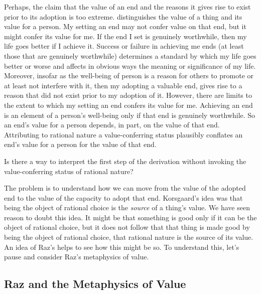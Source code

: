 \documentclass[12pt]{article}
\begin{document}
Perhaps, the claim that the value of an end and the reasons it gives rise to exist prior to its adoption is too extreme. \citet{Raz:2001ps} distinguishes the value of a thing and its value for a person. My setting an end may not confer value on that end, but it might confer its value for me. If the end I set is genuinely worthwhile, then my life goes better if I achieve it. Success or failure in achieving me ends (at least those that are genuinely worthwhile) determines a standard by which my life goes better or worse and affects in obvious ways the meaning or significance of my life. Moreover, insofar as the well-being of person is a reason for others to promote or at least not interfere with it, then my adopting a valuable end, gives rise to a reason that did not exist prior to my adoption of it. However, there are limits to the extent to which my setting an end confers its value for me. Achieving an end is an element of a person's well-being only if that end is genuinely worthwhile. So an end's value for a person depends, in part, on the value of that end. Attributing to rational nature a value-conferring status plausibly conflates an end's value for a person for the value of that end.

Is there a way to interpret the first step of the derivation without invoking the value-conferring status of rational nature? 

The problem is to understand how we can move from the value of the adopted end to the value of the capacity to adopt that end. Korsgaard's idea was that being the object of rational choice is the \emph{source} of a thing's value. We have seen reason to doubt this idea. It might be that something is good only if it can be the object of rational choice, but it does not follow that that thing is made good by being the object of rational choice, that rational nature is the source of its value. An idea of Raz's helps to see how this might be so. To understand this, let's pause and consider Raz's metaphysics of value.


\subsection{Raz and the Metaphysics of Value}\label{sub:raz_and_the_metaphysics_of_value} %

\end{document}

